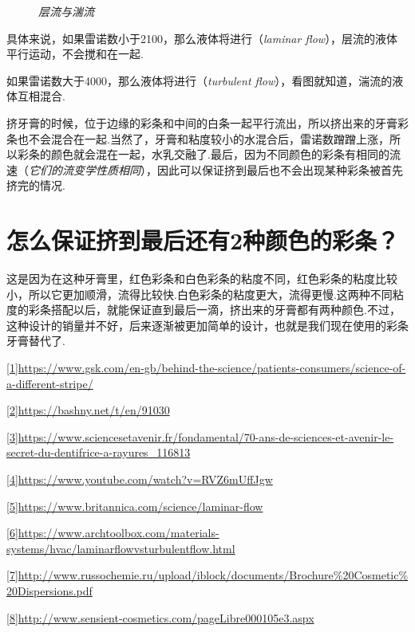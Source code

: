 \begin{multicols}{2}
\begin{figure}[H]
    \caption{\textit{层流与湍流}}
    
\end{figure}




具体来说，如果雷诺数小于2100，那么液体将进行（\textit{laminar flow}\/），层流的液体平行运动，不会搅和在一起.

如果雷诺数大于4000，那么液体将进行（\textit{turbulent flow}\/），看图就知道，湍流的液体互相混合.

挤牙膏的时候，位于边缘的彩条和中间的白条一起平行流出，所以挤出来的牙膏彩条也不会混合在一起.当然了，牙膏和粘度较小的水混合后，雷诺数蹭蹭上涨，所以彩条的颜色就会混在一起，水乳交融了.最后，因为不同颜色的彩条有相同的流速（\textit{它们的流变学性质相同}），因此可以保证挤到最后也不会出现某种彩条被首先挤完的情况.

\section*{怎么保证挤到最后还有2种颜色的彩条？}

这是因为在这种牙膏里，红色彩条和白色彩条的粘度不同，红色彩条的粘度比较小，所以它更加顺滑，流得比较快.白色彩条的粘度更大，流得更慢.这两种不同粘度的彩条搭配以后，就能保证直到最后一滴，挤出来的牙膏都有两种颜色.不过，这种设计的销量并不好，后来逐渐被更加简单的设计，也就是我们现在使用的彩条牙膏替代了.
\end{multicols}

\noindent {}

\noindent\url{[1]https://www.gsk.com/en-gb/behind-the-science/patients-consumers/science-of-a-different-stripe/}

\noindent\url{[2]https://bashny.net/t/en/91030}

\noindent\url{[3]https://www.sciencesetavenir.fr/fondamental/70-ans-de-sciences-et-avenir-le-secret-du-dentifrice-a-rayures\_116813}

\noindent\url{[4]https://www.youtube.com/watch?v=RVZ6mUffJgw}

\noindent\url{[5]https://www.britannica.com/science/laminar-flow}

\noindent\url{[6]https://www.archtoolbox.com/materials-systems/hvac/laminarflowvsturbulentflow.html}

\noindent\url{[7]http://www.russochemie.ru/upload/iblock/documents/Brochure\%20Cosmetic\%20Dispersions.pdf}

\noindent\url{[8]http://www.sensient-cosmetics.com/pageLibre000105e3.aspx}


